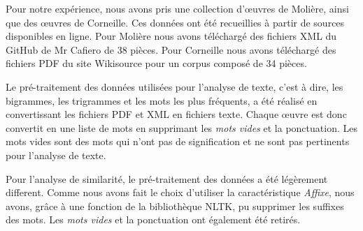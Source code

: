 \vspace{\baselineskip}
\hspace{0,5cm}Pour notre expérience, nous avons pris une collection d'œuvres de Molière,
ainsi que des œuvres de Corneille. Ces données ont été
recueillies à partir de sources disponibles en ligne. Pour Molière nous avons
téléchargé des fichiers XML du GitHub de Mr Cafiero de 38 pièces. Pour Corneille
nous avons téléchargé des fichiers PDF du site Wikisource pour un corpus composé
de 34 pièces.

\vspace{\baselineskip}

\hspace{0,5cm}Le pré-traitement des données utilisées pour l'analyse de texte,
c'est à dire, les bigrammes, les trigrammes et les mots les plus fréquents, a été
réalisé en convertissant les fichiers PDF et XML en fichiers texte. Chaque œuvre
est donc convertit en une liste de mots en supprimant les \textit{mots vides} et
la ponctuation. Les mots vides sont des mots qui n'ont pas de signification et
ne sont pas pertinents pour l'analyse de texte.

\hspace{0,5cm}Pour l'analyse de similarité, le pré-traitement des données a été
légèrement different. Comme nous avons fait le choix d'utiliser la caractéristique
\textit{Affixe}, nous avons, grâce à une fonction de la bibliothèque NLTK, pu
supprimer les suffixes des mots. Les \textit{mots vides} et la ponctuation ont
également été retirés.
